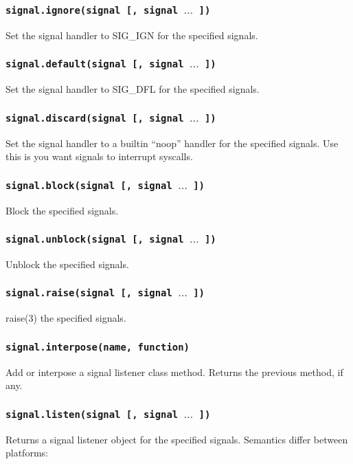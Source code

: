 \documentclass[11pt, oneside]{memoir}
\newcommand*{\fn}[1]{\texttt{#1}\xspace}
\begin{document}
\subsubsection[\fn{signal.ignore}]{\fn{signal.ignore(signal [, signal $\ldots $ ])}}
Set the signal handler to SIG\_IGN for the specified signals.

\subsubsection[\fn{signal.default}]{\fn{signal.default(signal [, signal $\ldots$ ])}}
Set the signal handler to SIG\_DFL for the specified signals.

\subsubsection[\fn{signal.discard}]{\fn{signal.discard(signal [, signal $\ldots$ ])}}
Set the signal handler to a builtin ``noop'' handler for the specified signals. Use this is you want signals to interrupt syscalls.

\subsubsection[\fn{signal.block}]{\fn{signal.block(signal [, signal $\ldots$ ])}}
Block the specified signals.

\subsubsection[\fn{signal.unblock}]{\fn{signal.unblock(signal [, signal $\ldots$ ])}}
Unblock the specified signals.

\subsubsection[\fn{signal.raise}]{\fn{signal.raise(signal [, signal $\ldots$ ])}}
raise(3) the specified signals.

\subsubsection[\fn{signal.interpose}]{\fn{signal.interpose(name, function)}}
Add or interpose a signal listener class method. Returns the previous method, if any.

\subsubsection[\fn{signal.listen}]{\fn{signal.listen(signal [, signal $\ldots$ ])}}
Returns a signal listener object for the specified signals. Semantics differ between platforms:
\end{document}
